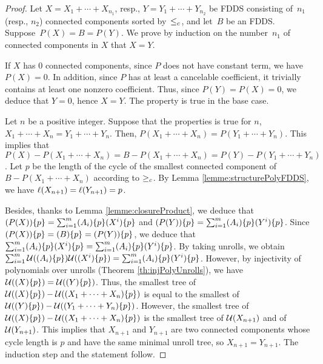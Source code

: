 	\begin{proof}
	        Let $X = X_1 + \cdots + X_{n_1}$, resp., $Y = Y_1 + \cdots + Y_{n_2}$ be FDDS consisting of~$n_1$ (resp., $n_2$) connected components sorted by~$\le_{c}$, and let~$B$ be an FDDS. Suppose~$P(X) = B = P(Y)$.
		We prove by induction on the number~$n_1$ of connected components in $X$ that $X = Y$.
		
		If $X$ has $0$ connected components, since $P$ does not have constant term, we have $P(X) = 0$.
		In addition, since $P$ has at least a cancelable coefficient, it trivially contains at least one nonzero coefficient.
		Thus, since $P(Y) = P(X) = 0$, we deduce that $Y = 0$, hence $X = Y$.
		The property is true in the base case.
		
		Let $n$ be a positive integer.
		Suppose that the properties is true for $n$, \ie $X_1 + \cdots + X_n = Y_1 + \cdots + Y_n$.
		Then, $P(X_1 + \cdots + X_n) = P( Y_1 + \cdots + Y_n)$.
		This implies that $P(X) - P(X_1 + \cdots + X_n) = B - P(X_1 + \cdots + X_n) = P(Y) -  P(Y_1 + \cdots + Y_n)$.
		Let $p$ be the length of the cycle of the smallest connected component of $B - P(X_1 + \cdots + X_n)$ according to $\ge_{c}$.
		By Lemma \ref{lemme:structurePolyFDDS}, 
		we have $\ell(X_{n+1}) = \ell(Y_{n+1}) = p$.
		
		Besides, thanks to Lemma \ref{lemme:closureProduct}, we deduce that $(P(X))\{p\} = \sum_{i=1}^{m} (A_i)\{p\} (X^i)\{p\}$ and $(P(Y))\{p\} = \sum_{i=1}^{m} (A_i)\{p\} (Y^i)\{p\}$.
		Since $(P(X))\{p\} = (B)\{p\} = (P(Y))\{p\}$, we deduce that $ \sum_{i=1}^{m} (A_i)\{p\} (X^i)\{p\} =  \sum_{i=1}^{m} (A_i)\{p\} (Y^i)\{p\}$.
		By taking unrolls, we obtain $\sum_{i=1}^{m} \mathcal{U}((A_i)\{p\}) \mathcal{U}((X^i)\{p\}) =  \sum_{i=1}^{m} (A_i)\{p\} (Y^i)\{p\}$.
		However, by injectivity of polynomials over unrolls (Theorem \ref{th:injPolyUnrolls}), we have $\mathcal{U}((X)\{p\}) = \mathcal{U}((Y)\{p\})$.
		Thus, the smallest tree of $\mathcal{U}((X)\{p\}) - \mathcal{U}((X_1 + \cdots + X_n)\{p\})$ is equal to the smallest of $\mathcal{U}((Y)\{p\}) - \mathcal{U}((Y_1 + \cdots + Y_n)\{p\})$.
		However, the smallest tree of $\mathcal{U}((X)\{p\}) - \mathcal{U}((X_1 + \cdots + X_n)\{p\})$ is the smallest tree of $\mathcal{U}(X_{n+1})$ and of $\mathcal{U}(Y_{n+1})$.
		This implies that $X_{n+1}$ and $Y_{n+1}$ are two connected components whose cycle length is $p$ and have the same minimal unroll tree, so $X_{n+1} = Y_{n+1}$.
		The induction step and the statement follow.
	\end{proof}
	
